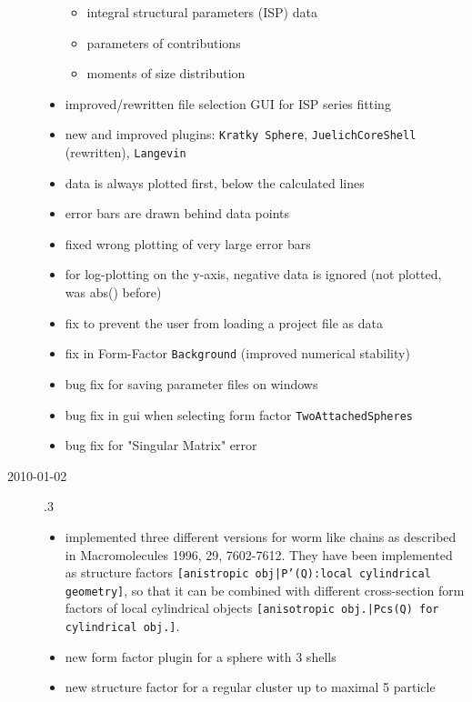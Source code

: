 \begin{description}
\begin{itemize}
            \begin{itemize}
                \item integral structural parameters (ISP) data
                \item parameters of contributions
                \item moments of size distribution
            \end{itemize}
            \item  improved/rewritten file selection GUI for ISP series fitting
            \item  new and improved plugins: \texttt{Kratky Sphere}, \texttt{JuelichCoreShell} (rewritten), \texttt{Langevin}
            \item data is always plotted first, below the calculated lines
            \item error bars are drawn behind data points
            \item fixed wrong plotting of very large error bars
            \item for log-plotting on the y-axis, negative data is ignored (not plotted, was abs() before)
            \item fix to prevent the user from loading a \SASfit project file as data
            \item fix in Form-Factor \texttt{Background} (improved numerical stability)
            \item bug fix for saving parameter files on windows
            \item bug fix in gui when selecting form factor \texttt{TwoAttachedSpheres}
            \item bug fix for "Singular Matrix" error
        \end{itemize}
    \item[2010-01-02] .3
        \begin{itemize}
        \item implemented three different versions for worm like chains as
              described in Macromolecules 1996, 29, 7602-7612. They have
              been implemented as structure factors
              \texttt{[anistropic obj|P'(Q):local cylindrical geometry]},
              so that it can be combined with different cross-section
              form factors of local cylindrical objects
              \texttt{[anisotropic obj.|Pcs(Q) for cylindrical obj.]}.
        \item new form factor plugin for a sphere with 3 shells
        \item new structure factor for a regular cluster up to maximal 5 particle

\end{itemize}
\end{description}
